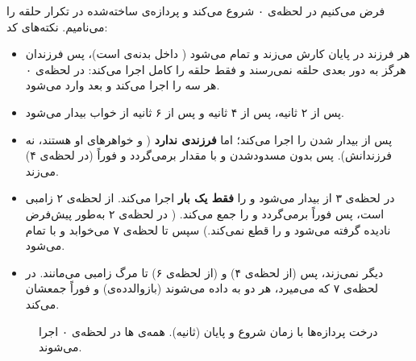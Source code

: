 فرض می‌کنیم  در لحظه‌ی ۰ شروع می‌کند و پردازه‌ی ساخته‌شده در تکرار  حلقه را  می‌نامیم. نکته‌های کد:
\begin{itemize}
  \item هر فرزند در پایان کارش  می‌زند و تمام می‌شود ( داخل بدنه‌ی  است)، پس فرزندان هرگز به دور بعدی حلقه نمی‌رسند و فقط  حلقه را کامل اجرا می‌کند: در لحظه‌ی ۰ هر سه  را اجرا می‌کند و بعد وارد  می‌شود.
  \item {} پس از ۲ ثانیه،  پس از ۴ ثانیه و  پس از ۶ ثانیه از خواب بیدار می‌شود.
  \item {} پس از بیدار شدن  را اجرا می‌کند؛ اما  \textbf{فرزندی ندارد} ( و  خواهرهای او هستند، نه فرزندانش). پس  بدون مسدودشدن و با مقدار  برمی‌گردد و  فوراً (در لحظه‌ی ۴)  می‌زند.
  \item {} در لحظه‌ی ۳ از  بیدار می‌شود و  را \textbf{فقط یک بار} اجرا می‌کند.  از لحظه‌ی ۲ زامبی است، پس  فوراً برمی‌گردد و  را جمع می‌کند. ( در لحظه‌ی ۲ به‌طور پیش‌فرض نادیده گرفته می‌شود و  را قطع نمی‌کند.) سپس  تا لحظه‌ی ۷ می‌خوابد و با  تمام می‌شود.
  \item {} دیگر  نمی‌زند، پس  (از لحظه‌ی ۴) و  (از لحظه‌ی ۶) تا مرگ  زامبی می‌مانند. در لحظه‌ی ۷ که  می‌میرد، هر دو به  داده می‌شوند (بازوالدده‌ی) و  فوراً جمعشان می‌کند.
\end{itemize}

\begin{figure}[ht]\centering
\begin{LTR}
\end{LTR}
\caption{درخت پردازه‌ها با زمان شروع و پایان (ثانیه). همه‌ی ها در لحظه‌ی ۰ اجرا می‌شوند.}
\end{figure}


